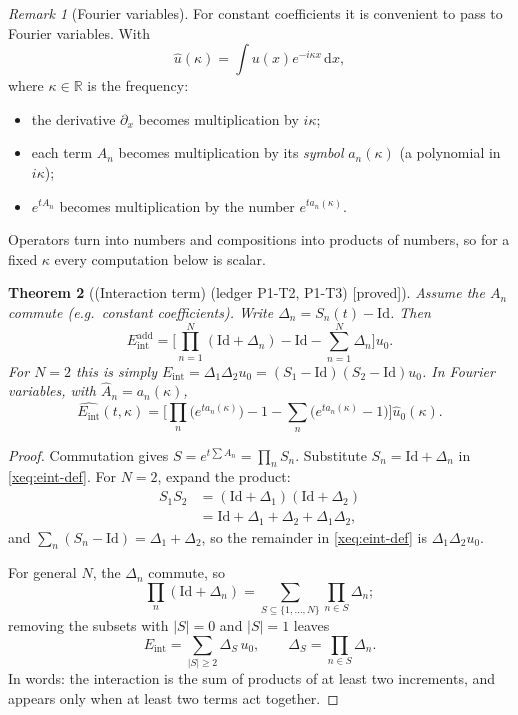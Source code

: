 \documentclass[11pt]{article}
\theoremstyle{plain}
\newtheorem{theorem}{Theorem}[section]
\theoremstyle{definition}
\theoremstyle{remark}
\newtheorem{remark}[theorem]{Remark}
\newcommand{\R}{\mathbb{R}}
\newcommand{\dd}{\,\mathrm{d}}
\newcommand{\Id}{\mathrm{Id}}
\newcommand{\Eint}{E_{\mathrm{int}}}        %
\newcommand{\badge}[2]{\textcolor{#1}{\textsf{\footnotesize[#2]}}}
\newcommand{\proved}[1][]{\badge{cC}{proved#1}}
\newcommand{\led}[1]{\textcolor{cG}{\textsf{\footnotesize(ledger #1)}}}
\newenvironment{notebox}[1]{\begin{remark}[#1]}{\end{remark}}
\begin{document}
\begin{notebox}{Fourier variables}
For constant coefficients it is convenient to pass to Fourier variables. With
\[
\hat u(\kappa)=\int u(x)e^{-i\kappa x}\dd x,
\]
where $\kappa\in\R$ is the frequency:
\begin{itemize}[nosep]
\item the derivative $\partial_x$ becomes multiplication by $i\kappa$;
\item each term $A_n$ becomes multiplication by its \emph{symbol} $a_n(\kappa)$ (a polynomial in $i\kappa$);
\item $e^{tA_n}$ becomes multiplication by the number $e^{ta_n(\kappa)}$.
\end{itemize}
Operators turn into numbers and compositions into products of numbers, so for a fixed $\kappa$ every computation below is scalar.
\end{notebox}
\begin{theorem}[{(Interaction term) \led{P1-T2, P1-T3} \proved[]}]\label{xthm:eint}
Assume the $A_n$ commute (e.g.\ constant coefficients). Write $\Delta_n=S_n(t)-\Id$. Then
\begin{equation}\label{eq:eint}
\Eint^{\mathrm{add}}=\Big[\prod_{n=1}^N(\Id+\Delta_n)-\Id-\sum_{n=1}^N\Delta_n\Big]u_0 .
\end{equation}
For $N=2$ this is simply $\Eint=\Delta_1\Delta_2u_0=(S_1-\Id)(S_2-\Id)u_0$. In Fourier variables, with $\hat A_n=a_n(\kappa)$,
\[
\widehat{\Eint}(t,\kappa)=\Big[\prod_n\big(e^{ta_n(\kappa)}\big)-1-\sum_n\big(e^{ta_n(\kappa)}-1\big)\Big]\hat u_0(\kappa).
\]
\end{theorem}
\begin{proof}
Commutation gives $S=e^{t\sum A_n}=\prod_nS_n$. Substitute $S_n=\Id+\Delta_n$ in \eqref{xeq:eint-def}. For $N=2$, expand the product:
\[
\begin{aligned}
S_1S_2&=(\Id+\Delta_1)(\Id+\Delta_2)\\
&=\Id+\Delta_1+\Delta_2+\Delta_1\Delta_2 ,
\end{aligned}
\]
and $\sum_n(S_n-\Id)=\Delta_1+\Delta_2$, so the remainder in \eqref{xeq:eint-def} is $\Delta_1\Delta_2u_0$.

For general $N$, the $\Delta_n$ commute, so
\[
\prod_n(\Id+\Delta_n)=\sum_{S\subseteq\{1,\dots,N\}}\prod_{n\in S}\Delta_n ;
\]
removing the subsets with $|S|=0$ and $|S|=1$ leaves
\[
\Eint=\sum_{|S|\ge2}\Delta_S\,u_0,\qquad \Delta_S=\prod_{n\in S}\Delta_n .
\]
In words: the interaction is the sum of products of at least two increments, and appears only when at least two terms act together.
\end{proof}
\end{document}
